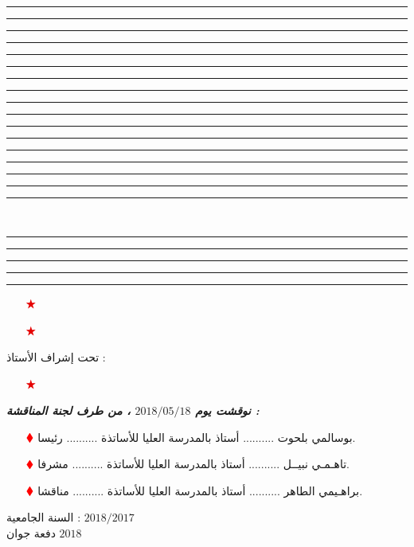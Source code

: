 \documentclass[12pt,A4]{article}
\begin{document}
\vskip0.43pt
\textcolor{Verde}{
\hrule\hrule\hrule\hrule\hrule\hrule\hrule
\hrule\hrule\hrule\hrule\hrule
\vspace{1.3pt}
\hrule\hrule\hrule\hrule\hrule
\vspace{0.1cm}}
\begin{LARGE}
\begin{center}
\textcolor{black}{} \\[3pt]
\textcolor{black}{}
\end{center}
\end{LARGE}
\textcolor{Verde}{
\hrule\hrule\hrule\hrule\hrule}
\vspace{0.9cm}
\begin{center}
\begin{minipage}{7cm}

{\large {}}
\begin{itemize}
\item[$\textcolor{red!90!black}{\bigstar}$]
\item[$\textcolor{red!90!black}{\bigstar}$]
\end{itemize}

\end{minipage}
\hspace{2cm}
\begin{minipage}{6cm}
\vspace{-1.1cm}
{\large\m تحت إشراف الأستاذ }:
\begin{itemize}
\item[$\textcolor{red!90!black}{\bigstar}$]
\end{itemize}
\end{minipage}
\end{center}
\vspace{8pt}
\begin{center}
\m
\vspace{-0.20cm}
\textbf{\emph{نوقشت يوم
 $2018/05/18$ 
 ، من طرف لجنة المناقشة :}}
\begin{itemize}
\n
\item[$\textcolor{red}{\blacklozenge}$] 
بوسالمي بلحوت
  ..........
 أستاذ بالمدرسة العليا للأساتذة
 ..........
 رئيسا.
\item[$\textcolor{red}{\blacklozenge}$]
تاهـمـي نبيــل
 ..........
 أستاذ بالمدرسة العليا للأساتذة
 ..........
 مشرفا.
\item[$\textcolor{red}{\blacklozenge}$]
براهـيمي الطاهر
 ..........
 أستاذ بالمدرسة العليا للأساتذة
 ..........
مناقشا.
\end{itemize}
\vspace{0.29cm}
\begin{center}
السنة الجامعية : $2018/2017$ \\
دفعة جوان 
$2018$
\end{center}
\end{center}
   
\end{document}
